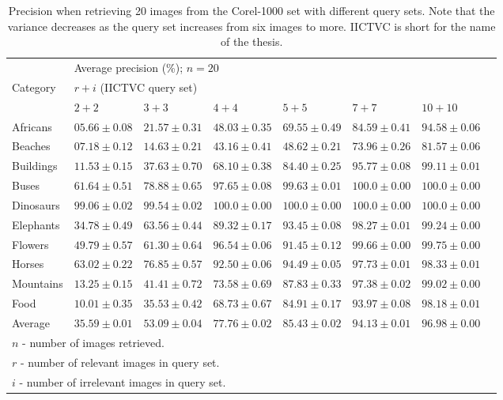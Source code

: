 \begin{table}	
\centering
\begin{scriptsize}
\begin{tabular}{l l l l l l l l}		
\hline					
 					 		& \multicolumn{6}{l}{Average precision (\%); $n=20$} \\ 
\cline{2-7}
Category 			 		&   \multicolumn{6}{l}{$r+i$ (IICTVC query set)} \\
 							& 	$2+2$  			&	$3+3$  			&	$4+4$  			&	$5+5$  			&	$7+7$  			&	$10+10$	\\ 
\hline
Africans		 			&	$05.66\pm0.08 $ &	$21.57\pm0.31 $ &	$48.03\pm0.35 $ &	$69.55\pm0.49 $ &	$84.59\pm0.41 $ &	$94.58\pm0.06 $	\\
Beaches 					&	$07.18\pm0.12 $ &	$14.63\pm0.21 $ &	$43.16\pm0.41 $ &	$48.62\pm0.21 $ &	$73.96\pm0.26 $ &	$81.57\pm0.06 $	\\
Buildings 					&	$11.53\pm0.15 $ &	$37.63\pm0.70 $ &	$68.10\pm0.38 $ &	$84.40\pm0.25 $ &	$95.77\pm0.08 $ &	$99.11\pm0.01 $	\\
Buses 					 	&	$61.64\pm0.51 $ &	$78.88\pm0.65 $ &	$97.65\pm0.08 $ &	$99.63\pm0.01 $ &	$100.0\pm0.00 $ &	$100.0\pm0.00 $	\\
Dinosaurs 					&	$99.06\pm0.02 $ &	$99.54\pm0.02 $ &	$100.0\pm0.00 $ &	$100.0\pm0.00 $ & 	$100.0\pm0.00 $ &	$100.0\pm0.00 $	\\
Elephants 					&	$34.78\pm0.49 $ &	$63.56\pm0.44 $ &	$89.32\pm0.17 $ &	$93.45\pm0.08 $ &	$98.27\pm0.01 $ &	$99.24\pm0.00 $	\\
Flowers 					&	$49.79\pm0.57 $ &	$61.30\pm0.64 $ &	$96.54\pm0.06 $ &	$91.45\pm0.12 $ &	$99.66\pm0.00 $ &	$99.75\pm0.00 $	\\
Horses 						&	$63.02\pm0.22 $ &	$76.85\pm0.57 $ &	$92.50\pm0.06 $ &	$94.49\pm0.05 $ &	$97.73\pm0.01 $ &	$98.33\pm0.01 $	\\
Mountains 					&	$13.25\pm0.15 $ &	$41.41\pm0.72 $ &	$73.58\pm0.69 $ &	$87.83\pm0.33 $ &	$97.38\pm0.02 $ &	$99.02\pm0.00 $	\\
Food 						&	$10.01\pm0.35 $ &	$35.53\pm0.42 $ &	$68.73\pm0.67 $ &	$84.91\pm0.17 $ &	$93.97\pm0.08 $ &	$98.18\pm0.01 $	\smallskip\\ 
Average						&	$35.59\pm0.01 $ &	$53.09\pm0.04 $ &	$77.76\pm0.02 $ &	$85.43\pm0.02 $  &	$94.13\pm0.01 $ &	$96.98\pm0.00 $ \\ 
\hline
\multicolumn{7}{l}{$n$ - number of images retrieved.}\\
\multicolumn{7}{l}{$r$ - number of relevant images in query set.}\\
\multicolumn{7}{l}{$i$ - number of irrelevant images in query set.}
\end{tabular}							
\end{scriptsize}
\caption{Precision when retrieving 20 images from the Corel-1000 set with different query sets. Note that the variance decreases as the query set increases from six images to more. IICTVC is short for the name of the thesis.}
\label{table:res:cbir:prec20}
\end{table}							
